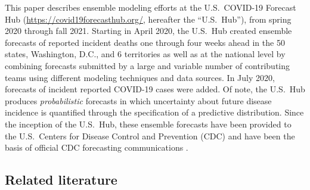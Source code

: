 \documentclass[11pt,3p,review,authoryear]{elsarticle}
\begin{document}
This paper describes ensemble modeling efforts at the U.S.\ COVID-19 Forecast Hub (\url{https://covid19forecasthub.org/}, hereafter the ``U.S.\ Hub''), from spring 2020 through fall 2021.
Starting in April 2020, the U.S.\ Hub created ensemble forecasts of reported incident deaths one through four weeks ahead in the 50 states, Washington, D.C., and 6 territories as well as at the national level by combining forecasts submitted by a large and variable number of contributing teams using different modeling techniques and data sources.
In July 2020, forecasts of incident reported COVID-19 cases were added.
Of note, the U.S.\ Hub produces \textit{probabilistic} forecasts in which uncertainty about future disease incidence is quantified through the specification of a predictive distribution.
Since the inception of the U.S.\ Hub, these ensemble forecasts have been provided to the U.S.\ Centers for Disease Control and Prevention (CDC) and have been the basis of official CDC forecasting communications \citep{cdc_covid_modeling}.

\subsection{Related literature}
\end{document}
